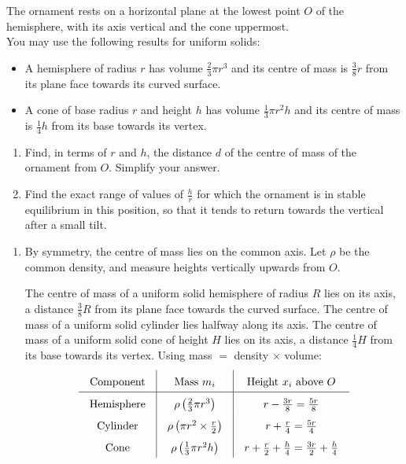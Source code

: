 \documentclass[leqno]{article}
\begin{document}
\begin{enumerate}[
  label=\textbf{\arabic*.},
  leftmargin=*,
  topsep=0pt,
  partopsep=0pt,
  parsep=0pt
]
The ornament rests on a horizontal plane at the lowest point $O$ of the hemisphere, with its axis vertical and the cone uppermost. \\

You may use the following results for uniform solids:
\begin{itemize}[nosep]
\item A hemisphere of radius $r$ has volume $\frac{2}{3}\pi r^3$ and its centre of mass is $\frac38 r$ from its plane face towards its curved surface.
\item A cone of base radius $r$ and height $h$ has volume $\frac{1}{3}\pi r^2h$ and its centre of mass is $\frac14 h$ from its base towards its vertex.
\end{itemize}
\begin{enumerate}[label=\textbf{(\alph*)}]
\item Find, in terms of $r$ and $h$, the distance $d$ of the centre of mass of the ornament from $O$. Simplify your answer.  \\
\item Find the exact range of values of $\frac{h}{r}$ for which the ornament is in stable equilibrium in this position, so that it tends to return towards the vertical after a small tilt.  \\
\end{enumerate}

\vspace*{10pt}

\begin{djsSolution}
\begin{enumerate}[label=\textbf{(\alph*)}, start=1]
\item
By symmetry, the centre of mass lies on the common axis. Let \(\rho\) be the common density, and measure heights vertically upwards from \(O\).

The centre of mass of a uniform solid hemisphere of radius \(R\) lies on its axis, a distance \(\frac38 R\) from its plane face towards the curved surface.
The centre of mass of a uniform solid cylinder lies halfway along its axis.
The centre of mass of a uniform solid cone of height \(H\) lies on its axis, a distance \(\frac14 H\) from its base towards its vertex.
Using mass \(=\) density \(\times\) volume:
\[
\begingroup
\renewcommand{\arraystretch}{1.65}
\setlength{\arraycolsep}{10pt}
\begin{array}{c|c|c}
\text{Component} & \text{Mass }m_i & \text{Height }x_i\text{ above }O\\ \hline
\text{Hemisphere} & \rho\left(\frac23\pi r^3\right)
& r-\frac{3r}{8}=\frac{5r}{8}\\
\text{Cylinder} & \rho\left(\pi r^2\times\frac r2\right)
& r+\frac r4=\frac{5r}{4}\\
\text{Cone} & \rho\left(\frac13\pi r^2h\right)
& r+\frac r2+\frac h4=\frac{3r}{2}+\frac h4
\end{array}
\endgroup
\]


\end{enumerate}
\end{djsSolution}
\end{enumerate}
\end{document}
